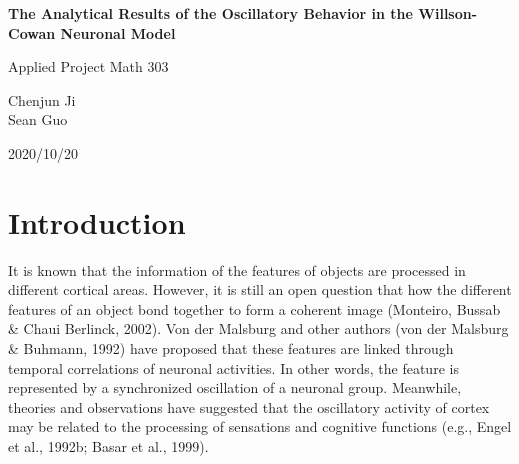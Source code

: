 \documentclass[12pt]{article}
\begin{document}
\begin{titlepage}
\begin{center}

    \vspace*{4cm}
    {\LARGE{\textbf{The Analytical Results of the Oscillatory Behavior in the Willson-Cowan Neuronal Model }}\par}

    \vspace{2cm}
    {\large Applied Project Math 303}

    \vspace{2cm}
    {\large
        Chenjun Ji\\
        Sean Guo 
    \par}
    
    \vspace{1cm}
    {\large
    2020/10/20
    \par}

\end{center}
\end{titlepage}

\tableofcontents

\section{ Introduction}

It is known that the information of the features of objects are processed in different cortical areas. However, it is still an open question that how the different features of an object bond together to form a coherent image (Monteiro, Bussab \& Chaui Berlinck, 2002). Von der Malsburg and other authors (von der Malsburg \& Buhmann, 1992) have proposed that these features are linked through temporal correlations of neuronal activities. In other words, the feature is represented by a synchronized oscillation of a neuronal group. Meanwhile, theories and observations have suggested that the oscillatory activity of cortex may be related to the processing of sensations and cognitive functions (e.g., Engel et al., 1992b; Basar et al., 1999).
\end{document}
